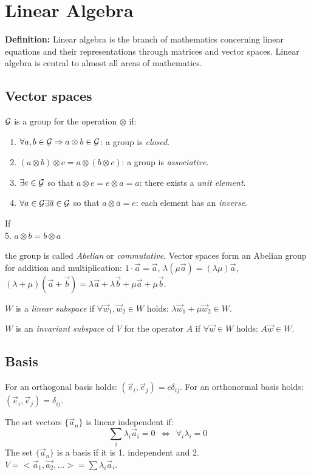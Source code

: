 \chapter{Linear Algebra}
\textbf{Definition:} Linear algebra is the branch of mathematics concerning linear equations and their representations through matrices and vector spaces. Linear algebra is central to almost all areas of mathematics.

\section{Vector spaces}
$\cal G$ is a group for the operation $\otimes$ if:
\begin{enumerate}
	\item $\forall a,b\in{\cal G}\Rightarrow a\otimes b\in\cal G$: a group is
	{\it closed}.
	\item $(a\otimes b)\otimes c = a\otimes (b\otimes c)$: a group is
	{\it associative}.
	\item $\exists e\in{\cal G}$ so that $a\otimes e=e\otimes a=a$: there exists a
	{\it unit element}.
	\item $\forall a\in{\cal G}\exists \overline{a}\in{\cal G}$ so that $a\otimes\overline{a}=e$:
	each element has an {\it inverse}.
\end{enumerate}
If\\
\hspace*{4.5mm}5. $a\otimes b=b\otimes a$

the group is called {\it Abelian} or {\it commutative}.
Vector spaces form an Abelian group for addition and multiplication:
$1\cdot\vec{a}=\vec{a}$, $\lambda(\mu\vec{a})=(\lambda\mu)\vec{a}$,
$(\lambda+\mu)(\vec{a}+\vec{b})=\lambda\vec{a}+\lambda\vec{b}+\mu\vec{a}+\mu\vec{b}$.

$W$ is a {\it linear subspace} if $\forall \vec{w}_1,\vec{w}_2\in W$
holds: $\lambda\vec{w}_1+\mu\vec{w}_2\in W$.

$W$ is an {\it invariant subspace} of $V$ for the operator $A$ if
$\forall\vec{w}\in W$ holds: $A\vec{w}\in W$.

\section{Basis}
For an orthogonal basis holds: $(\vec{e}_i,\vec{e}_j)=c\delta_{ij}$. For an
orthonormal basis holds:  $(\vec{e}_i,\vec{e}_j)=\delta_{ij}$.

The set vectors $\{\vec{a}_n\}$ is linear independent if:
\[
\sum\limits_i\lambda_i\vec{a}_i=0~~\Leftrightarrow~~\forall_i\lambda_i=0
\]
The set $\{\vec{a}_n\}$ is a basis if it is 1. independent and 2.
$V=<\vec{a}_1,\vec{a_2},...>=\sum\lambda_i\vec{a}_i$.

